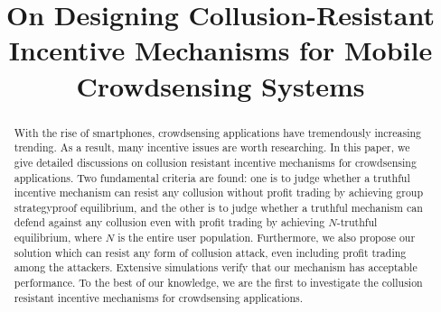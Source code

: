 \documentclass[conference]{IEEEtran}
\theoremstyle{definition}
\begin{document}
\title{On Designing Collusion-Resistant Incentive Mechanisms for Mobile Crowdsensing Systems}
\author{
}
\maketitle

{\color{black}
\begin{abstract}

With the rise of smartphones, crowdsensing applications have tremendously increasing trending. As a result, many incentive issues are worth researching. In this paper, we give detailed discussions on collusion resistant incentive mechanisms for crowdsensing applications. Two fundamental criteria are found: one is to judge whether a truthful incentive mechanism can resist any collusion without profit trading by achieving group strategyproof equilibrium, and the other is to judge whether a truthful mechanism can defend against any collusion even with 
profit trading {\color{blue}by achieving $N$-truthful equilibrium, where $N$ is the entire user population}. Furthermore, we also propose our solution which can resist any form of collusion attack, even including profit trading among the attackers. {\color{blue}Extensive simulations verify that our mechanism has acceptable performance}. To the best of our knowledge, we are the first to investigate the collusion resistant incentive mechanisms for crowdsensing applications.
\end{abstract}
}
\end{document}
